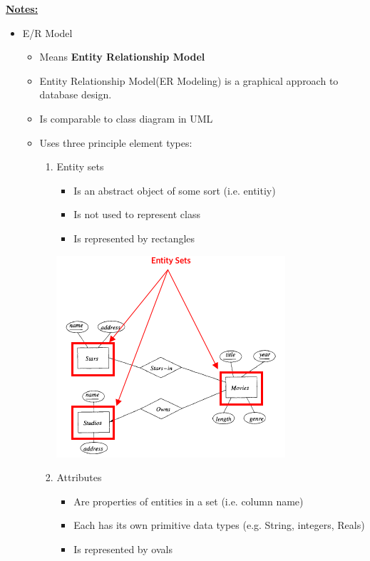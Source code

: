 \documentclass[12pt]{article}
\begin{document}
\begin{enumerate}[1.]
    \bigskip

    \underline{\textbf{Notes:}}

    \bigskip

    \begin{itemize}
        \item E/R Model
        \begin{itemize}
            \item Means \textbf{Entity Relationship Model}
            \item Entity Relationship Model(ER Modeling) is a graphical approach to database design.
            \item Is comparable to class diagram in UML
            \item Uses three principle element types:

            \begin{enumerate}[1.]
                \item Entity sets
                \begin{itemize}
                    \item Is an abstract object of some sort (i.e. entitiy)
                    \item Is not used to represent class
                    \item Is represented by rectangles
                \end{itemize}

                \begin{center}
                \includegraphics[width=0.7\linewidth]{images/worksheet_14_solution_1.png}
                \end{center}

                \item Attributes
                \begin{itemize}
                    \item Are properties of entities in a set (i.e. column name)
                    \item Each has its own primitive data types (e.g. String, integers, Reals)
                    \item Is represented by ovals
                \end{itemize}


\end{enumerate}
\end{itemize}
\end{itemize}
\end{enumerate}
\end{document}
